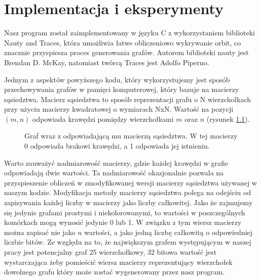 \chapter{Implementacja i eksperymenty}
Nasz program został zaimplementowany w języku C z wykorzystaniem biblioteki Nauty and Traces\cite{nauty}, która umożliwia łatwe obliczeniowo wykrywanie orbit, co znacznie przyspiesza proces generowania grafów. 
Autorem biblioteki nauty jest Brendan D. McKay, natomiast twórcą Traces jest Adolfo Piperno.

Jednym z aspektów powyższego kodu, który wykorzystujemy jest sposób przechowywania grafów w pamięci komputerowej, który bazuje na macierzy sąsiedztwa. Macierz sąsiedztwa to sposób reprezentacji grafu o N wierzchołkach przy użyciu macierzy kwadratowej o wymiarach NxN. Wartość na pozycji $(m, n)$ odpowiada  krawędzi pomiędzy wierzchołkami $m$ oraz $n$ (rysunek \ref{exmatrix}).
\begin{figure}[H]
  \centering
  \hfill
  \hfill
  \hfill
  \hfill
  \caption{Graf wraz z odpowiadającą mu macierzą sąsiedztwa. W tej macierzy 0 odpowiada brakowi krawędzi, a 1 odpowiada jej istnieniu.}
  \label{exmatrix}
\end{figure}

Warto zauważyć nadmiarowość macierzy, gdzie każdej krawędzi w grafie odpowiadają dwie wartości. Ta nadmiarowość okazjonalnie pozwala na przyspieszenie obliczeń w zmodyfikowanej wersji macierzy sąsiedztwa używanej w naszym kodzie.
Modyfikacja metody macierzy sąsiedztwa polega na odejściu od zapisywania każdej liczby w macierzy jako liczby całkowitej. Jako że zajmujemy się jedynie grafami prostymi i niekolorowanymi, to wartości w poszczególnych komórkach mogą wynosić jedynie 0 lub 1. W związku z tym wiersz macierzy można zapisać nie jako $n$ wartości, a jako jedną liczbę całkowitą o odpowiedniej liczbie bitów. Ze względu na to, że największym grafem występującym w naszej pracy jest potencjalny graf 25 wierzchołkowy, 32 bitowa wartość jest wystarczająca żeby pomieścić wiersz macierzy reprezentujący wierzchołek dowolnego grafu który może zostać wygenerowany przez nasz program. 


